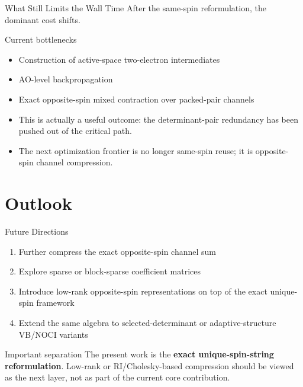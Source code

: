 \documentclass{beamer}
\begin{document}
\begin{frame}{What Still Limits the Wall Time}
  After the same-spin reformulation, the dominant cost shifts.

  \begin{block}{Current bottlenecks}
    \begin{itemize}
      \item Construction of active-space two-electron intermediates
      \item AO-level backpropagation
      \item Exact opposite-spin mixed contraction over packed-pair channels
    \end{itemize}
  \end{block}

  \begin{itemize}
    \item This is actually a useful outcome: the determinant-pair redundancy has
          been pushed out of the critical path.
    \item The next optimization frontier is no longer same-spin reuse; it is
          opposite-spin channel compression.
  \end{itemize}
\end{frame}

\section{Outlook}

\begin{frame}{Future Directions}
  \begin{enumerate}
    \item Further compress the exact opposite-spin channel sum
    \item Explore sparse or block-sparse coefficient matrices
    \item Introduce low-rank opposite-spin representations on top of the exact
          unique-spin framework
    \item Extend the same algebra to selected-determinant or adaptive-structure
          VB/NOCI variants
  \end{enumerate}

  \vspace{0.6em}
  \begin{block}{Important separation}
    The present work is the \textbf{exact unique-spin-string reformulation}.
    Low-rank or RI/Cholesky-based compression should be viewed as the next
    layer, not as part of the current core contribution.
  \end{block}
\end{frame}
\end{document}
